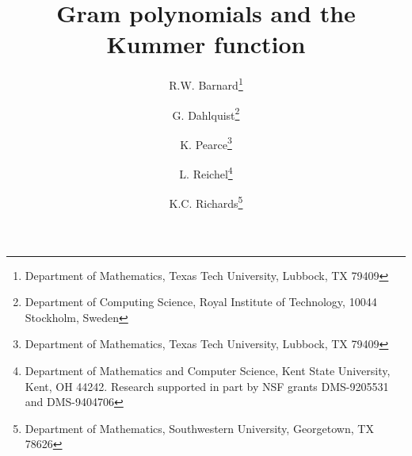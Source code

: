 \newcommand{\dis}{\displaystyle}
\newcommand{\be}{\begin{equation}}
\newcommand{\ee}{\end {equation}}
\newcommand{\R}{\rm I\kern-.19emR}
\newcommand{\M}{\rm I\kern-.19emM}
\newcommand{\N}{\makebox[.80em]{\rm N\kern-.70emN}}
\newtheorem{example}[theorem]{Example}{\rm}
\newcommand{\arw}{\mbox{$\rightarrow$}}
\newcommand{\vs}{\vspace{.15in}}
\newcommand{\vb}{\vspace{.4in}}
\newcommand{\vbb}{\vspace{1in}}
\newcommand{\mc}{\multicolumn}


\title{Gram polynomials and the Kummer function}


\author{R.W. Barnard\thanks{Department of Mathematics, Texas Tech
University, Lubbock, TX 79409}
\and
G. Dahlquist\thanks{Department of Computing Science, Royal Institute
of Technology, 10044 Stockholm, Sweden}
\and
K. Pearce\thanks{Department of Mathematics, Texas Tech University,
Lubbock, TX 79409}
\and
L. Reichel\thanks{Department of Mathematics and Computer Science,
Kent State University, Kent, OH 44242. Research supported in part by
NSF grants DMS-9205531 and DMS-9404706}
\and
K.C. Richards\thanks{Department of Mathematics, Southwestern
University, Georgetown, TX 78626}
}



\maketitle

